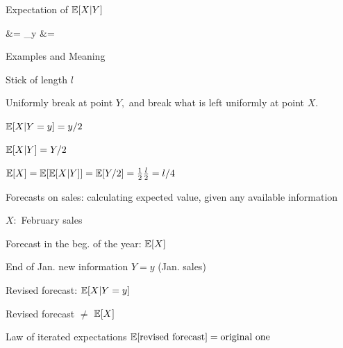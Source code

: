 \documentclass[handout,fleqn,aspectratio=169]{beamer}
\begin{document}
\begin{frame}{Expectation of $\mathbb{E}[ X|Y ]$}

\plitemsep 0.1in



\aleq
{
 &= \sum_{y}  \py \cr
&= 
}
\end{frame}

\begin{frame}{Examples and Meaning}

{
\plitemsep 0.1in


\bci 
\item<2-> Stick of length $l$
\item<2-> Uniformly break at point $Y,$ and break what is left uniformly at point $X.$

\item<3-> $\mathbb{E}[ X | Y=y ] = y/2$ 

\item<3-> $\mathbb{E}[ X | Y ] = Y/2$ 

\item<4-> $\mathbb{E}[ X ] = \mathbb{E}[ \mathbb{E}[ X|Y ] ] = \mathbb{E}[ Y/2 ]=\frac{1}{2}\frac{l}{2} = l/4$
\eci
}
{
\plitemsep 0.1in


\bci 
\item<5-> Forecasts on sales: calculating expected value, given any available information

\item<6-> $X:$ February sales

\item<6-> Forecast in the beg. of the year: $\mathbb{E}[ X ]$

\item<7-> End of Jan. new information $Y=y$ (Jan. sales)

Revised forecast: $\mathbb{E}[ X|Y=y ]$

Revised forecast $\neq$ $\mathbb{E}[ X ]$

\item<8-> Law of iterated expectations
$\mathbb{E}[ \text{revised forecast} ] = \text{original one}$

\eci

}
\end{frame}
\end{document}
